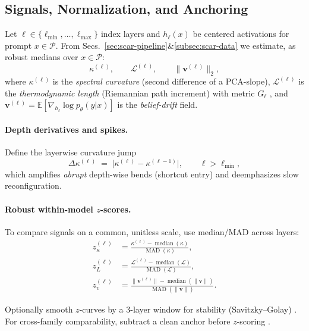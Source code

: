 \documentclass[11pt]{article}
\begin{document}
\vspace{0.6em}
\subsection{Signals, Normalization, and Anchoring}
\label{subsec:scar-signals}
Let $\ell\in\{\ell_{\min},\ldots,\ell_{\max}\}$ index layers and $h_\ell(x)$ be centered activations for prompt $x\in\mathcal{P}$.
From Secs.~\ref{sec:scar-pipeline}\&\ref{subsec:scar-data} we estimate, as robust medians over $x\in\mathcal{P}$:
\[
\kappa^{(\ell)},\qquad \mathcal{L}^{(\ell)},\qquad \|\mathbf{v}^{(\ell)}\|_2,
\]
where $\kappa^{(\ell)}$ is the \emph{spectral curvature} (second difference of a PCA-slope), $\mathcal{L}^{(\ell)}$ is the \emph{thermodynamic length} (Riemannian path increment) with metric $G_\ell$ \citep{amari2016ig,crooks2007measuring}, and $\mathbf{v}^{(\ell)}=\mathbb{E}[\nabla_{h_\ell}\log p_\theta(y|x)]$ is the \emph{belief-drift} field.

\paragraph{Depth derivatives and spikes.}
Define the layerwise curvature jump
\[
\Delta\kappa^{(\ell)} \;=\; \big|\kappa^{(\ell)}-\kappa^{(\ell-1)}\big|,\qquad \ell>\ell_{\min},
\]
which amplifies \emph{abrupt} depth-wise bends (shortcut entry) and deemphasizes slow reconfiguration.

\paragraph{Robust within-model $z$-scores.}
To compare signals on a common, unitless scale, use median/MAD across layers:
\[
\begin{aligned}
z_\kappa^{(\ell)} &= \frac{\kappa^{(\ell)} - \operatorname{median}(\kappa)}{\operatorname{MAD}(\kappa)},\\
z_L^{(\ell)}      &= \frac{\mathcal{L}^{(\ell)} - \operatorname{median}(\mathcal{L})}{\operatorname{MAD}(\mathcal{L})},\\
z_v^{(\ell)}      &= \frac{\|\mathbf{v}^{(\ell)}\| - \operatorname{median}(\|\mathbf{v}\|)}{\operatorname{MAD}(\|\mathbf{v}\|)}.
\end{aligned}
\]

Optionally smooth $z$-curves by a 3-layer window for stability (Savitzky–Golay) \citep{savitzky1964savgol}. For cross-family comparability, subtract a clean anchor before $z$-scoring \citep{kornblith2019cka,raghu2017svcca}.
\end{document}

